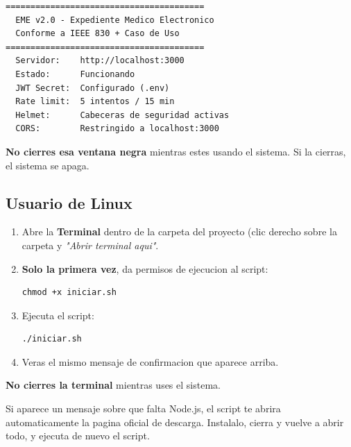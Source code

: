 \documentclass[11pt,a4paper]{article}
\begin{document}
\begin{lstlisting}
========================================
  EME v2.0 - Expediente Medico Electronico
  Conforme a IEEE 830 + Caso de Uso
========================================
  Servidor:    http://localhost:3000
  Estado:      Funcionando
  JWT Secret:  Configurado (.env)
  Rate limit:  5 intentos / 15 min
  Helmet:      Cabeceras de seguridad activas
  CORS:        Restringido a localhost:3000
\end{lstlisting}

\begin{cajaCritica}
    \textbf{No cierres esa ventana negra} mientras estes usando el sistema. Si la cierras, el sistema se apaga.
\end{cajaCritica}

\subsection{Usuario de Linux}

\begin{enumerate}
    \item Abre la \textbf{Terminal} dentro de la carpeta del proyecto (clic derecho sobre la carpeta y \textit{"Abrir terminal aqui"}.
    \item \textbf{Solo la primera vez}, da permisos de ejecucion al script:
          \begin{lstlisting}
chmod +x iniciar.sh
\end{lstlisting}
    \item Ejecuta el script:
          \begin{lstlisting}
./iniciar.sh
\end{lstlisting}
    \item Veras el mismo mensaje de confirmacion que aparece arriba.
\end{enumerate}

\begin{cajaCritica}
    \textbf{No cierres la terminal} mientras uses el sistema.
\end{cajaCritica}

\begin{cajaTip}
    Si aparece un mensaje sobre que falta Node.js, el script te abrira automaticamente la pagina oficial de descarga. Instalalo, cierra y vuelve a abrir todo, y ejecuta de nuevo el script.
\end{cajaTip}

\end{document}
